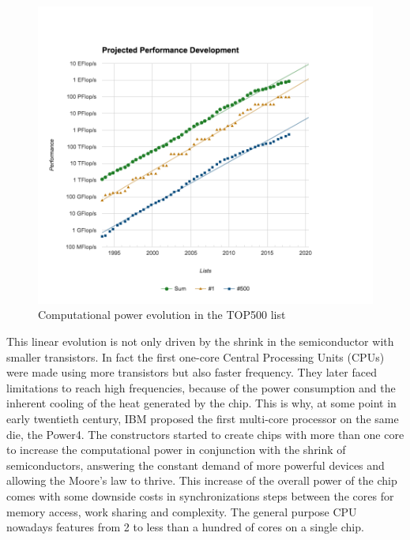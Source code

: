 \begin{figure}
\includegraphics[width=\linewidth]{figures/introduction/top500_list_approximation.png}
\caption{Computational power evolution in the TOP500 list}
\label{fig:intro_top500}
\end{figure}

This linear evolution is not only driven by the shrink in the semiconductor with smaller transistors.
In fact the first one-core Central Processing Units (CPUs) were made using more transistors but also faster frequency.
They later faced limitations to reach high frequencies, because of the power consumption and the inherent cooling of the heat generated by the chip.
This is why, at some point in early twentieth century, IBM proposed the first multi-core processor on the same die, the Power4.
The constructors started to create chips with more than one core to increase the computational power in conjunction with the shrink of semiconductors, answering the constant demand of more powerful devices and allowing the Moore's law to thrive. 
This increase of the overall power of the chip comes with some downside costs in synchronizations steps between the cores for memory access, work sharing and complexity.
The general purpose CPU nowadays features from 2 to less than a hundred of cores on a single chip.\\

